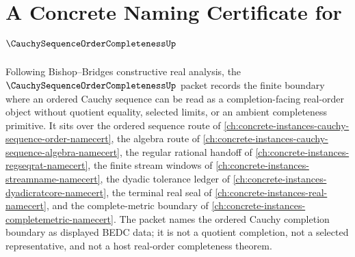 \chapter{A Concrete Naming Certificate for $\CauchySequenceOrderCompletenessUp$}
\label{ch:concrete-instances-cauchy-sequence-order-completeness-namecert}

Following Bishop--Bridges constructive real analysis, the $\CauchySequenceOrderCompletenessUp$ packet records the finite boundary where an ordered Cauchy sequence can be read as a completion-facing real-order object without quotient equality, selected limits, or an ambient completeness primitive. It sits over the ordered sequence route of \autoref{ch:concrete-instances-cauchy-sequence-order-namecert}, the algebra route of \autoref{ch:concrete-instances-cauchy-sequence-algebra-namecert}, the regular rational handoff of \autoref{ch:concrete-instances-regseqrat-namecert}, the finite stream windows of \autoref{ch:concrete-instances-streamname-namecert}, the dyadic tolerance ledger of \autoref{ch:concrete-instances-dyadicratcore-namecert}, the terminal real seal of \autoref{ch:concrete-instances-real-namecert}, and the complete-metric boundary of \autoref{ch:concrete-instances-completemetric-namecert}. The packet names the ordered Cauchy completion boundary as displayed BEDC data; it is not a quotient completion, not a selected representative, and not a host real-order completeness theorem.

